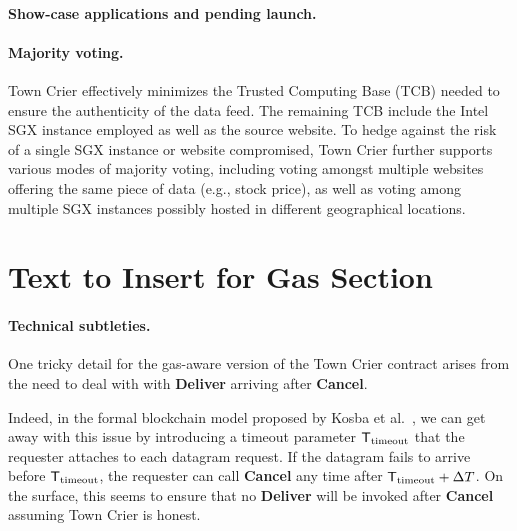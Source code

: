 \paragraph{Show-case applications and pending launch.}



\paragraph{Majority voting.}
Town Crier effectively minimizes the 
Trusted Computing Base (TCB) needed to ensure
the authenticity of the data feed.
The remaining TCB include the Intel SGX 
instance employed as well as the source website. 
To hedge against the risk of a single SGX instance
or website compromised, Town Crier further supports 
various modes of majority voting,  
including voting amongst multiple 
websites offering the same piece of data (e.g., stock price),  
as well as voting among multiple SGX instances possibly
hosted in different geographical locations.



\section{Text to Insert for Gas Section} 



\newcommand{\Ttimeout}{\ensuremath{{\sf T}_{\text{timeout}}}\xspace}

\paragraph{Technical subtleties.}
One tricky detail for the gas-aware version of the Town Crier 
contract arises from the need to deal with  
with {\bf Deliver}
arriving after {\bf Cancel}.

Indeed, in the formal blockchain model
proposed by Kosba et al.~\cite{hawk}, we can get away with this issue 
by introducing 
a timeout parameter
$\Ttimeout$ that the requester attaches to each datagram request. 
If the datagram fails to arrive before $\Ttimeout$, 
the requester can call {\bf Cancel}
any time after 
$\Ttimeout + \Delta T$.  
On the surface, this 
seems to ensure that no {\bf Deliver} will be invoked
after {\bf Cancel} assuming Town Crier is honest. 

